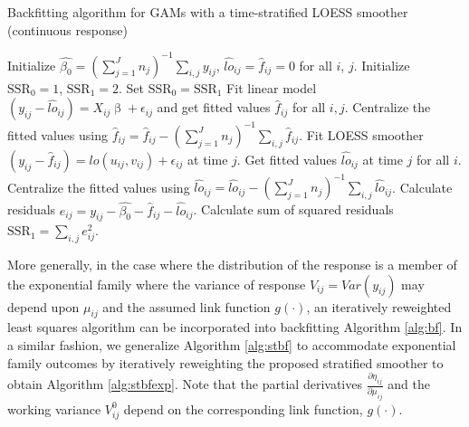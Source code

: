 	\begin{algorithm}[h]
		\caption{\linespread{1}\selectfont{} Backfitting algorithm for GAMs with a time-stratified LOESS smoother (continuous response)} \label{alg:stbf}
		\begin{algorithmic}[1]
			\State Initialize $\hat{\beta_0}=(\sum_{j=1}^J n_j)^{-1}\sum_{i,j} y_{ij}$, $\hat{lo}_{ij}=\hat{f}_{ij}=0$ for all $i$, $j$. 
			\State Initialize $\text{SSR}_0=1$, $\text{SSR}_1=2$.
			\State Set $\text{SSR}_0=\text{SSR}_1$
			\State Fit linear model $(y_{ij}-\hat{lo}_{ij})=X_{ij}\upbeta+\epsilon_{ij}$ and get fitted values $\hat{f}_{ij}$ for all $i,j$. 
			\State Centralize the fitted values using
			 $\hat{f}_{ij}=\hat{f}_{ij}-(\sum_{j=1}^J n_j)^{-1}\sum_{i,j}\hat{f}_{ij}$.
			\State Fit LOESS smoother $(y_{ij}-\hat{f}_{ij})= lo(u_{ij},v_{ij}) + \epsilon_{ij}$ at time $j$.
			\State Get fitted values $\hat{lo}_{ij}$ at time $j$ for all $i$.
			\State Centralize the fitted values using $\hat{lo}_{ij}=\hat{lo}_{ij}-(\sum_{j=1}^J n_j)^{-1}\sum_{i,j} \hat{lo}_{ij}$.
			\State Calculate residuals $e_{ij}=y_{ij}-\hat{\beta_0}-\hat{f}_{ij}-\hat{lo}_{ij}$.
			\State Calculate sum of squared residuals $\text{SSR}_1=\sum_{i,j} e_{ij}^2$.
			\EndFor
			\EndWhile
		\end{algorithmic}
	\end{algorithm}
	
	More generally, in the case where the distribution of the response is a member of the exponential family where the variance of response $V_{ij}=Var(y_{ij})$ may depend upon $\mu_{ij}$ and the assumed link function $g(\cdot)$, an iteratively reweighted least squares algorithm can be incorporated into backfitting Algorithm \ref{alg:bf}. \citep{hastie1990generalized} In a similar fashion, we generalize Algorithm \ref{alg:stbf} to accommodate exponential family outcomes by iteratively reweighting the proposed stratified smoother to obtain Algorithm \ref{alg:stbfexp}. Note that the partial derivatives $\frac{\partial \eta_{ij}}{\partial \mu_{ij}}$ and the working variance $V_{ij}^0$ depend on the corresponding link function, $g(\cdot)$. 
	
